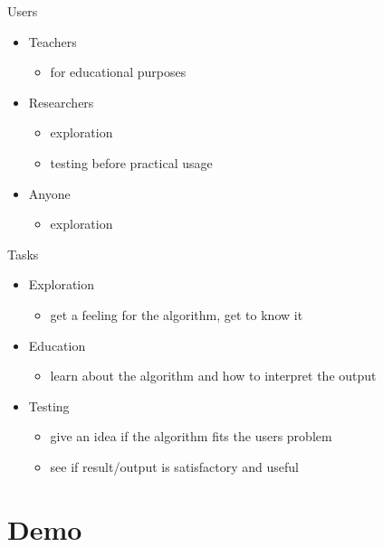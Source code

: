 \documentclass[naustrian]{beamer}
\begin{document}
\begin{frame}{Users}
\begin{itemize}
 \item Teachers
            \begin{itemize}
                \item for educational purposes
            \end{itemize}
  \item Researchers
            \begin{itemize}
                \item exploration
                \item testing before practical usage
            \end{itemize}
\item Anyone
            \begin{itemize}
                \item exploration
            \end{itemize}
  \end{itemize}
\end{frame}

\begin{frame}{Tasks}
\begin{itemize}
 \item Exploration
            \begin{itemize}
                \item get a feeling for the algorithm, get to know it
            \end{itemize}
 \item Education
  	\begin{itemize}
                \item learn about the algorithm and how to interpret the output
            \end{itemize}
  \item Testing
            \begin{itemize}
                \item give an idea if the algorithm fits the users problem
                \item see if result/output is satisfactory and useful
            \end{itemize}
  \end{itemize}
\end{frame}

{
\section{Demo}
}
\end{document}
